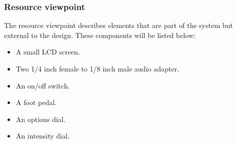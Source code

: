       
            
            
        
    \subsubsection{Resource viewpoint}
        The resource viewpoint describes elements that are part of the system but external to the design. These components will be listed below:
         \begin{itemize}
            \item A small LCD screen.
            \item Two 1/4 inch female to 1/8 inch male audio adapter.
            \item An on/off switch.
            \item A foot pedal.
            \item An options dial.
            \item An intensity dial.
\end{itemize}
    
    
